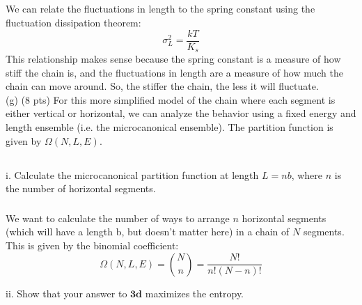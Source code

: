 \documentclass[12pt]{article}
\begin{document}
\subsection{}
We can relate the fluctuations in length to the spring constant using the fluctuation dissipation theorem:
\begin{equation}
  \sigma_{L}^{2} = \frac{kT}{K_{s}}
\end{equation}
This relationship makes sense because the spring constant is a measure of how stiff the chain is, and the fluctuations in length are a measure of how much the chain can move around. So, the stiffer the chain, the less it will fluctuate.\\

(g) (8 pts) For this more simplified model of the chain where each segment is either vertical or horizontal, we can analyze the behavior using a fixed energy and length ensemble (i.e. the microcanonical ensemble). The partition function is given by $\Omega(N, L, E)$.
\subsection{}

i. Calculate the microcanonical partition function at length $L=n b$, where $n$ is the number of horizontal segments.
\subsubsection{}
We want to calculate the number of ways to arrange $n$ horizontal segments (which will have a length b, but doesn't matter here) in a chain of $N$ segments. This is given by the binomial coefficient:
\begin{equation}
  \Omega(N, L, E) = \binom{N}{n} = \frac{N!}{n!(N-n)!}
\end{equation}


ii. Show that your answer to $\mathbf{3 d}$ maximizes the entropy.
\end{document}
